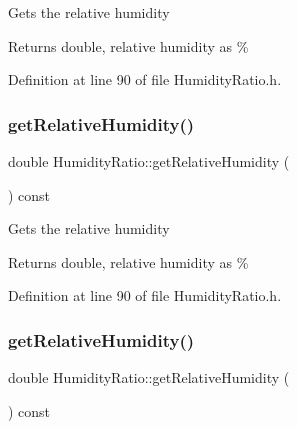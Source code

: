 Gets the relative humidity

\begin{DoxyReturn}{Returns}
double, relative humidity as \% 
\end{DoxyReturn}


Definition at line 90 of file Humidity\+Ratio.\+h.

\mbox{\label{class_humidity_ratio_af761b52e96bdf995e1a2bbbfd9e3b47f}} 
\subsubsection{\texorpdfstring{get\+Relative\+Humidity()}{getRelativeHumidity()}\hspace{0.1cm}{\footnotesize\ttfamily [2/3]}}
{\footnotesize\ttfamily double Humidity\+Ratio\+::get\+Relative\+Humidity (\begin{DoxyParamCaption}{ }\end{DoxyParamCaption}) const\hspace{0.3cm}{\ttfamily [inline]}}

Gets the relative humidity

\begin{DoxyReturn}{Returns}
double, relative humidity as \% 
\end{DoxyReturn}


Definition at line 90 of file Humidity\+Ratio.\+h.

\mbox{\label{class_humidity_ratio_af761b52e96bdf995e1a2bbbfd9e3b47f}} 
\subsubsection{\texorpdfstring{get\+Relative\+Humidity()}{getRelativeHumidity()}\hspace{0.1cm}{\footnotesize\ttfamily [3/3]}}
{\footnotesize\ttfamily double Humidity\+Ratio\+::get\+Relative\+Humidity (\begin{DoxyParamCaption}{ }\end{DoxyParamCaption}) const\hspace{0.3cm}{\ttfamily [inline]}}

